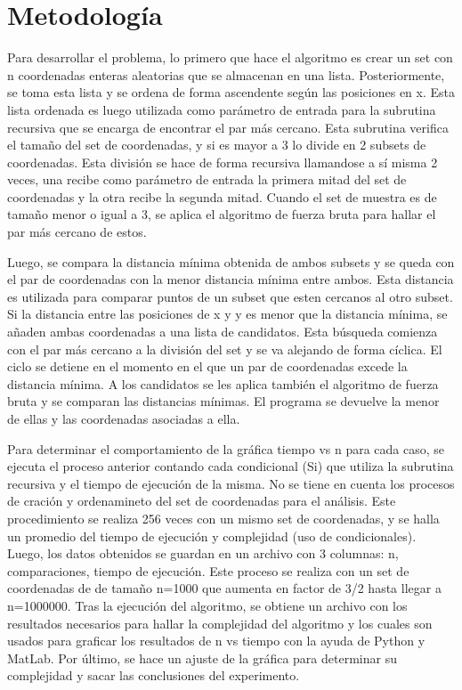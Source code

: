 \section{Metodología}
Para desarrollar el problema, lo primero que hace el algoritmo es crear un set con n coordenadas enteras aleatorias que se almacenan en una lista. Posteriormente, se toma esta lista y se ordena de forma ascendente según las posiciones en x. Esta lista ordenada es luego utilizada como parámetro de entrada para la subrutina recursiva que se encarga de encontrar el par más cercano. Esta subrutina verifica el tamaño del set de coordenadas, y si es mayor a 3 lo divide en 2 subsets de coordenadas. Esta división se hace de forma recursiva llamandose a sí misma 2 veces, una recibe como parámetro de entrada la primera mitad del set de coordenadas y la otra recibe la segunda mitad. Cuando el set de muestra es de tamaño menor o igual a 3, se aplica el algoritmo de fuerza bruta para hallar el par más cercano de estos. 

Luego, se compara la distancia mínima obtenida de ambos subsets y se queda con el par de coordenadas con la menor distancia mínima entre ambos. Esta distancia es utilizada para comparar puntos de un subset que esten cercanos al otro subset. Si la distancia entre las posiciones de x y y es menor que la distancia mínima, se añaden ambas coordenadas a una lista de candidatos. Esta búsqueda comienza con el par más cercano a la división del set y se va alejando de forma cíclica. El ciclo se detiene en el momento en el que un par de coordenadas excede la distancia mínima. A los candidatos se les aplica también el algoritmo de fuerza bruta y se comparan las distancias mínimas. El programa se devuelve la menor de ellas y las coordenadas asociadas a ella. 


 Para determinar el comportamiento de la gráfica tiempo vs n para cada caso, se ejecuta el proceso anterior contando cada condicional (Si) que utiliza la subrutina recursiva y el tiempo de ejecución de la misma. No se tiene en cuenta los procesos de cración y ordenamineto del set de coordenadas para el análisis. Este procedimiento se realiza 256 veces con un mismo set de coordenadas, y se halla un promedio del tiempo de ejecución y complejidad (uso de condicionales). Luego, los datos obtenidos se guardan en un archivo con 3 columnas: n, comparaciones, tiempo de ejecución. Este proceso se realiza con un set de coordenadas de de tamaño n=1000 que aumenta en factor de 3/2 hasta llegar a n=1000000. Tras la ejecución del algoritmo, se obtiene un archivo con los resultados necesarios para hallar la complejidad del algoritmo y los cuales son usados para graficar los resultados de n vs tiempo con la ayuda de Python y MatLab. Por último, se hace un ajuste de la gráfica para determinar su complejidad y sacar las conclusiones del experimento. 